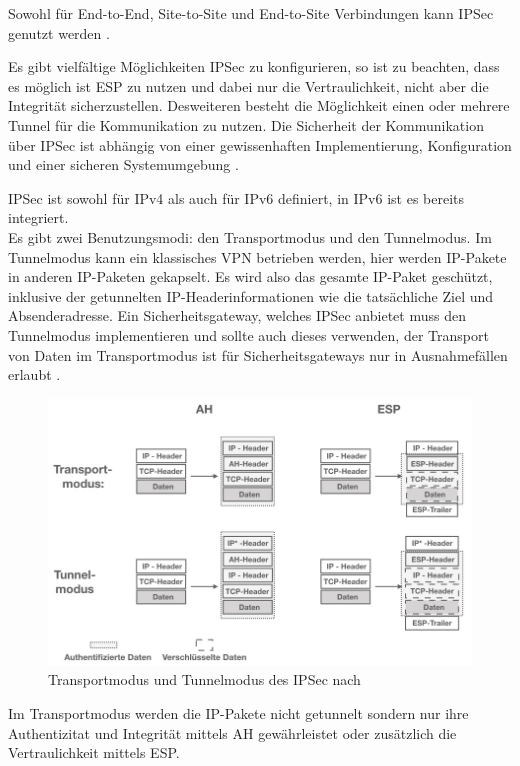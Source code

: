 Sowohl für End-to-End, Site-to-Site und End-to-Site Verbindungen kann IPSec genutzt werden \cite{rfc4301}.

 Es gibt vielfältige Möglichkeiten IPSec zu konfigurieren, so ist zu beachten, dass es möglich ist ESP zu nutzen und dabei nur die Vertraulichkeit, nicht aber die Integrität sicherzustellen. Desweiteren besteht die Möglichkeit einen oder mehrere Tunnel für die Kommunikation zu nutzen. Die Sicherheit der Kommunikation  über IPSec ist abhängig von einer gewissenhaften Implementierung, Konfiguration und einer sicheren Systemumgebung \cite{rfc4301}. 
  
  IPSec ist sowohl für IPv4 als auch für IPv6 definiert, in IPv6 ist es bereits integriert.
\\

Es gibt zwei Benutzungsmodi: den Transportmodus und den Tunnelmodus. Im  Tunnelmodus kann ein klassisches VPN betrieben werden, hier werden IP-Pakete in anderen IP-Paketen gekapselt. Es wird also das gesamte IP-Paket geschützt, inklusive der getunnelten IP-Headerinformationen wie die tatsächliche Ziel und Absenderadresse. Ein Sicherheitsgateway, welches IPSec anbietet muss den Tunnelmodus implementieren und sollte auch dieses verwenden, der Transport von Daten im Transportmodus ist für Sicherheitsgateways nur in Ausnahmefällen erlaubt \cite{rfc4301}. 
\begin{figure}[h]
	\includegraphics[width=\linewidth]{ahsep.001.jpeg}
	\caption{Transportmodus und Tunnelmodus des IPSec nach \cite{lipp2007vpn}}
	\label{ahesp}
\end{figure}
Im Transportmodus werden die IP-Pakete nicht getunnelt sondern nur ihre Authentizitat und Integrität mittels AH ge\-währleistet oder zusätzlich die Vertraulichkeit mittels ESP. 

